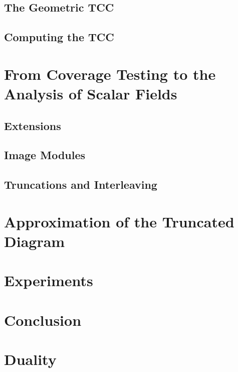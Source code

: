\documentclass[12pt]{article}
\begin{document}
  \subsection{The Geometric TCC}\label{sec:geo_tcc}
  

  \subsection{Computing the TCC}
  


\section{From Coverage Testing to the Analysis of Scalar Fields}\label{sec:middle}


  \subsection{Extensions}
  

  \subsection{Image Modules}
  

  \subsection{Truncations and Interleaving}\label{sec:interleaving}
  


\section{Approximation of the Truncated Diagram}\label{sec:truncations}



\section{Experiments}\label{sec:experiments}


\section{Conclusion}\label{sec:conclusion}







\appendix

\section{Duality}\label{apx:duality}

\end{document}
